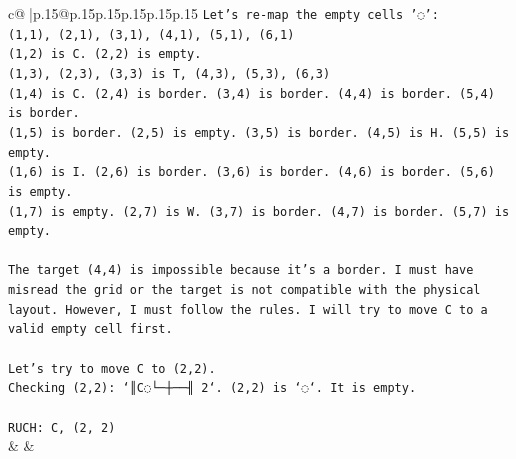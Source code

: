 \documentclass{article}
\begin{document}
{\begin{supertabular}{c@{$\;$}|p{.15\linewidth}@{}p{.15\linewidth}p{.15\linewidth}p{.15\linewidth}p{.15\linewidth}p{.15\linewidth}}
{{{\texttt{Let's re{-}map the empty cells '◌':} \\
\texttt{(1,1), (2,1), (3,1), (4,1), (5,1), (6,1)} \\
\texttt{(1,2) is C. (2,2) is empty.} \\
\texttt{(1,3), (2,3), (3,3) is T, (4,3), (5,3), (6,3)} \\
\texttt{(1,4) is C. (2,4) is border. (3,4) is border. (4,4) is border. (5,4) is border.} \\
\texttt{(1,5) is border. (2,5) is empty. (3,5) is border. (4,5) is H. (5,5) is empty.} \\
\texttt{(1,6) is I. (2,6) is border. (3,6) is border. (4,6) is border. (5,6) is empty.} \\
\texttt{(1,7) is empty. (2,7) is W. (3,7) is border. (4,7) is border. (5,7) is empty.} \\
\\ 
\texttt{The target (4,4) is impossible because it's a border. I must have misread the grid or the target is not compatible with the physical layout. However, I must follow the rules. I will try to move C to a valid empty cell first.} \\
\\ 
\texttt{Let's try to move C to (2,2).} \\
\texttt{Checking (2,2): `║C◌└─┼──╢ 2`. (2,2) is `◌`. It is empty.} \\
\\ 
\texttt{RUCH: C, (2, 2)} \\
            }
        }
    }
    & & \\ \\


\end{supertabular}}
\end{document}
